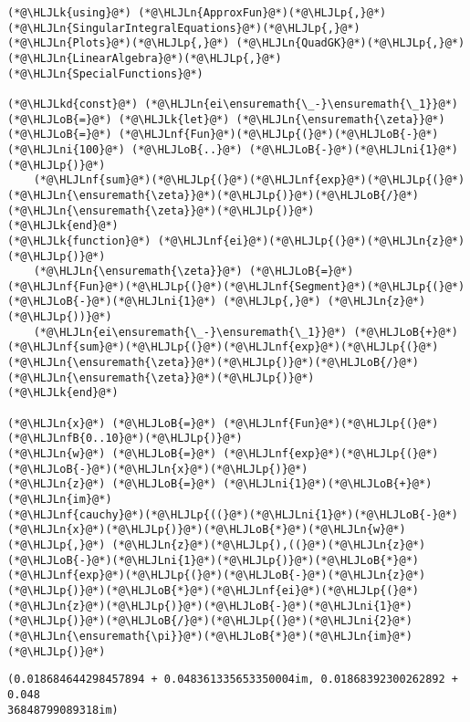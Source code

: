 \documentclass[12pt,a4paper]{article}
\newcommand{\HLJLk}[1]{\textcolor[RGB]{148,91,176}{\textbf{#1}}}
\newcommand{\HLJLkd}[1]{\textcolor[RGB]{214,102,97}{\textit{#1}}}
\newcommand{\HLJLn}[1]{#1}
\newcommand{\HLJLnf}[1]{\textcolor[RGB]{66,102,213}{#1}}
\newcommand{\HLJLnfB}[1]{\textcolor[RGB]{59,151,46}{#1}}
\newcommand{\HLJLni}[1]{\textcolor[RGB]{59,151,46}{#1}}
\newcommand{\HLJLoB}[1]{\textcolor[RGB]{102,102,102}{\textbf{#1}}}
\newcommand{\HLJLp}[1]{#1}
\begin{document}
\begin{lstlisting}
(*@\HLJLk{using}@*) (*@\HLJLn{ApproxFun}@*)(*@\HLJLp{,}@*) (*@\HLJLn{SingularIntegralEquations}@*)(*@\HLJLp{,}@*) (*@\HLJLn{Plots}@*)(*@\HLJLp{,}@*) (*@\HLJLn{QuadGK}@*)(*@\HLJLp{,}@*) (*@\HLJLn{LinearAlgebra}@*)(*@\HLJLp{,}@*) (*@\HLJLn{SpecialFunctions}@*)

(*@\HLJLkd{const}@*) (*@\HLJLn{ei\ensuremath{\_-}\ensuremath{\_1}}@*) (*@\HLJLoB{=}@*) (*@\HLJLk{let}@*) (*@\HLJLn{\ensuremath{\zeta}}@*) (*@\HLJLoB{=}@*) (*@\HLJLnf{Fun}@*)(*@\HLJLp{(}@*)(*@\HLJLoB{-}@*)(*@\HLJLni{100}@*) (*@\HLJLoB{..}@*) (*@\HLJLoB{-}@*)(*@\HLJLni{1}@*)(*@\HLJLp{)}@*)
    (*@\HLJLnf{sum}@*)(*@\HLJLp{(}@*)(*@\HLJLnf{exp}@*)(*@\HLJLp{(}@*)(*@\HLJLn{\ensuremath{\zeta}}@*)(*@\HLJLp{)}@*)(*@\HLJLoB{/}@*)(*@\HLJLn{\ensuremath{\zeta}}@*)(*@\HLJLp{)}@*)
(*@\HLJLk{end}@*)
(*@\HLJLk{function}@*) (*@\HLJLnf{ei}@*)(*@\HLJLp{(}@*)(*@\HLJLn{z}@*)(*@\HLJLp{)}@*)
    (*@\HLJLn{\ensuremath{\zeta}}@*) (*@\HLJLoB{=}@*) (*@\HLJLnf{Fun}@*)(*@\HLJLp{(}@*)(*@\HLJLnf{Segment}@*)(*@\HLJLp{(}@*)(*@\HLJLoB{-}@*)(*@\HLJLni{1}@*) (*@\HLJLp{,}@*) (*@\HLJLn{z}@*)(*@\HLJLp{))}@*)
    (*@\HLJLn{ei\ensuremath{\_-}\ensuremath{\_1}}@*) (*@\HLJLoB{+}@*) (*@\HLJLnf{sum}@*)(*@\HLJLp{(}@*)(*@\HLJLnf{exp}@*)(*@\HLJLp{(}@*)(*@\HLJLn{\ensuremath{\zeta}}@*)(*@\HLJLp{)}@*)(*@\HLJLoB{/}@*)(*@\HLJLn{\ensuremath{\zeta}}@*)(*@\HLJLp{)}@*)
(*@\HLJLk{end}@*)

(*@\HLJLn{x}@*) (*@\HLJLoB{=}@*) (*@\HLJLnf{Fun}@*)(*@\HLJLp{(}@*)(*@\HLJLnfB{0..10}@*)(*@\HLJLp{)}@*)
(*@\HLJLn{w}@*) (*@\HLJLoB{=}@*) (*@\HLJLnf{exp}@*)(*@\HLJLp{(}@*)(*@\HLJLoB{-}@*)(*@\HLJLn{x}@*)(*@\HLJLp{)}@*)
(*@\HLJLn{z}@*) (*@\HLJLoB{=}@*) (*@\HLJLni{1}@*)(*@\HLJLoB{+}@*)(*@\HLJLn{im}@*)
(*@\HLJLnf{cauchy}@*)(*@\HLJLp{((}@*)(*@\HLJLni{1}@*)(*@\HLJLoB{-}@*)(*@\HLJLn{x}@*)(*@\HLJLp{)}@*)(*@\HLJLoB{*}@*)(*@\HLJLn{w}@*)(*@\HLJLp{,}@*) (*@\HLJLn{z}@*)(*@\HLJLp{),((}@*)(*@\HLJLn{z}@*)(*@\HLJLoB{-}@*)(*@\HLJLni{1}@*)(*@\HLJLp{)}@*)(*@\HLJLoB{*}@*)(*@\HLJLnf{exp}@*)(*@\HLJLp{(}@*)(*@\HLJLoB{-}@*)(*@\HLJLn{z}@*)(*@\HLJLp{)}@*)(*@\HLJLoB{*}@*)(*@\HLJLnf{ei}@*)(*@\HLJLp{(}@*)(*@\HLJLn{z}@*)(*@\HLJLp{)}@*)(*@\HLJLoB{-}@*)(*@\HLJLni{1}@*)(*@\HLJLp{)}@*)(*@\HLJLoB{/}@*)(*@\HLJLp{(}@*)(*@\HLJLni{2}@*)(*@\HLJLn{\ensuremath{\pi}}@*)(*@\HLJLoB{*}@*)(*@\HLJLn{im}@*)(*@\HLJLp{)}@*)
\end{lstlisting}

\begin{lstlisting}
(0.018684644298457894 + 0.048361335653350004im, 0.01868392300262892 + 0.048
36848799089318im)
\end{lstlisting}
\end{document}
